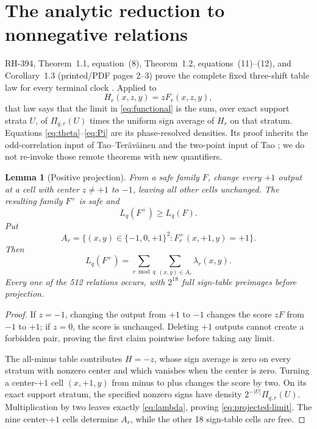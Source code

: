 \documentclass[11pt]{article}
\newtheorem{lemma}[theorem]{Lemma}
\theoremstyle{definition}
\theoremstyle{remark}
\newcommand{\T}{\{-1,0,+1\}}
\begin{document}
\section{The analytic reduction to nonnegative relations}

RH-394, Theorem~1.1, equation~(8), Theorem~1.2,
equations~(11)--(12), and Corollary~1.3 (printed/PDF pages 2--3) prove the
complete fixed three-shift table law for every terminal clock
\cite{RH394}.  Applied to
\[
 H_r(x,z,y)=zF_r(x,z,y),
\]
that law says that the limit in \eqref{eq:functional} is the sum, over
exact support strata \(U\), of \(\Pi_{q,r}(U)\) times the uniform sign
average of \(H_r\) on that stratum.  Equations
\eqref{eq:theta}--\eqref{eq:Pi} are its phase-resolved densities.  Its
proof inherits the odd-correlation input of Tao--Ter\"av\"ainen and the
two-point input of Tao \cite{TaoTeravainen2019,Tao2016LogChowla}; we do
not re-invoke those remote theorems with new quantifiers.

\begin{lemma}[Positive projection]
\label{lem:projection}
From a safe family \(F\), change every \(+1\) output at a cell with
center \(z\ne+1\) to \(-1\), leaving all other cells unchanged.  The
resulting family \(F^+\) is safe and
\[
 L_q(F^+)\geq L_q(F).
\]
Put
\begin{equation}
 A_r=\{(x,y)\in\T^2:F^+_r(x,+1,y)=+1\}.
 \label{eq:relation}
\end{equation}
Then
\begin{equation}
 L_q(F^+)=\sum_{r\bmod q}\sum_{(x,y)\in A_r}\lambda_r(x,y).
 \label{eq:projected-limit}
\end{equation}
Every one of the 512 relations occurs, with \(2^{18}\) full sign-table
preimages before projection.
\end{lemma}

\begin{proof}
If \(z=-1\), changing the output from \(+1\) to \(-1\) changes the score
\(zF\) from \(-1\) to \(+1\); if \(z=0\), the score is unchanged.
Deleting \(+1\) outputs cannot create a forbidden pair, proving the first
claim pointwise before taking any limit.

The all-minus table contributes \(H=-z\), whose sign average is zero on
every stratum with nonzero center and which vanishes when the center is
zero.  Turning a center-\(+1\) cell \((x,+1,y)\) from minus to plus changes
the score by two.  On its exact support stratum, the specified nonzero
signs have density \(2^{-|U|}\Pi_{q,r}(U)\).  Multiplication by two leaves
exactly \eqref{eq:lambda}, proving \eqref{eq:projected-limit}.  The nine
center-\(+1\) cells determine \(A_r\), while the other 18 sign-table cells
are free.
\end{proof}
\end{document}
